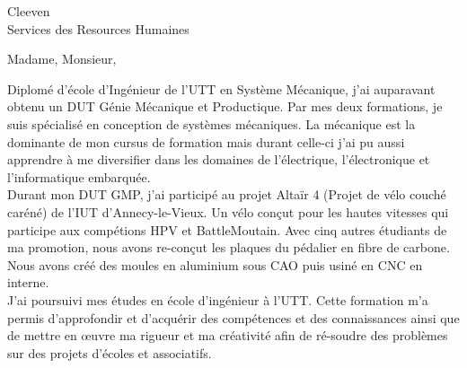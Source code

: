 \documentclass[a4paper,10pt]{scrlttr2}
\begin{document}


\begin{letter}{Cleeven \\ Services des Resources Humaines}

\pagestyle{empty}
\opening{Madame, Monsieur,}


Diplomé d’école d’Ingénieur de l’UTT en Système Mécanique, j’ai auparavant obtenu un DUT Génie Mécanique et Productique. Par mes deux formations, je suis spécialisé en conception de systèmes mécaniques. La mécanique est la dominante de mon cursus de formation mais durant celle-ci j’ai pu aussi apprendre à me diversifier dans les domaines de l’électrique, l’électronique et l’informatique embarquée.\\

Durant mon DUT GMP, j’ai participé au projet Altaïr 4 (Projet de vélo couché caréné) de l’IUT d’Annecy-le-Vieux. Un vélo conçut pour les hautes vitesses qui participe aux compétions HPV et BattleMoutain. Avec cinq autres étudiants de ma promotion, nous avons re-conçut les plaques du pédalier en fibre de carbone. Nous avons créé des moules en aluminium sous CAO puis usiné en CNC en interne.\\


J’ai poursuivi mes études en école d’ingénieur à l’UTT. Cette formation m’a permis d’approfondir et d’acquérir des compétences et des connaissances ainsi que de mettre en œuvre ma rigueur et ma créativité afin de ré-soudre des problèmes sur des projets d’écoles et associatifs.\\


\end{letter}
\end{document}
